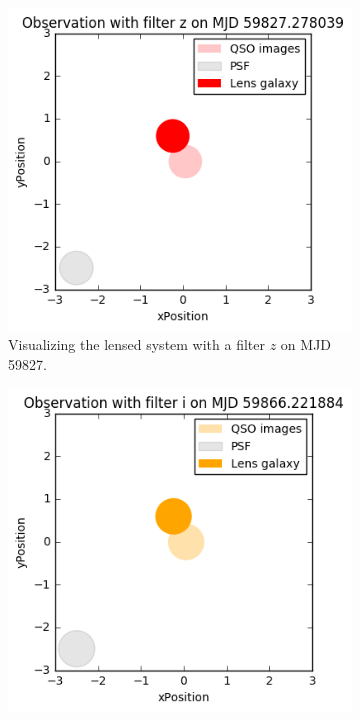 \documentclass[\docopts]{\docclass}
\begin{document}
\begin{figure}
    \centering
    \begin{subfigure}[b]{0.2\textwidth}
        \includegraphics[width=\textwidth]{plot-a.png}
        \caption{Visualizing the lensed system with a filter $z$ on MJD 59827.}
        \label{fig:vis_lens_a}
    \end{subfigure}
    \begin{subfigure}[b]{0.2\textwidth}
        \includegraphics[width=\textwidth]{plot-b.png}

\end{subfigure}
\end{figure}
\end{document}
